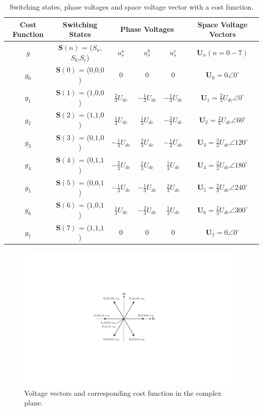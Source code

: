 \begin{table}[t]
\centering
\setlength{\tabcolsep}{5pt}
\begin{tabular}{    c|
    c|
    c|c|c|c
}
\toprule
\hline
\multicolumn{1}{c|}{Cost Function} & \multicolumn{1}{c|}{Switching States} & \multicolumn{3}{c}{Phase Voltages} & \multicolumn{1}{|c}{Space Voltage Vectors} \\
\hline
$g$ &$\mathbf{S}(n)$ = ($S_a$,$S_b$,$S_c$) & $u^a_{s}$ & $u^b_{s}$ & $u^c_{s}$ & $\mathbf{U}_n(n =0-7)$\\  
\hline
$g_0$ & $\mathbf{S}(0)$ = ($0$,$0$,$0$) & $0$ & $0$ & $0$ & $\mathbf{U}_0 =0\angle 0^\circ$ \\
$g_1$ &  $\mathbf{S}(1)$ = ($1$,$0$,$0$) & $\frac{2}{3}U_{dc}$ & $-\frac{1}{3}U_{dc}$ & $-\frac{1}{3}U_{dc}$ & $\mathbf{U}_1 =\frac{2}{3}U_{dc}\angle 0^\circ$\\
$g_2$ &  $\mathbf{S}(2)$ = ($1$,$1$,$0$) & $\frac{1}{3}U_{dc}$ & $\frac{1}{3}U_{dc}$ & $-\frac{2}{3}U_{dc}$ & $\mathbf{U}_2 =\frac{2}{3}U_{dc}\angle 60^\circ$\\
$g_3$ & $\mathbf{S}(3)$ = ($0$,$1$,$0$) & $-\frac{1}{3}U_{dc}$ & $\frac{2}{3}U_{dc}$ & $-\frac{1}{3}U_{dc}$ & $\mathbf{U}_3 =\frac{2}{3}U_{dc}\angle 120^\circ$ \\
$g_4$ & $\mathbf{S}(4)$ = ($0$,$1$,$1$) & $-\frac{2}{3}U_{dc}$ & $\frac{1}{3}U_{dc}$ & $\frac{1}{3}U_{dc}$ & $\mathbf{U}_4 =\frac{2}{3}U_{dc}\angle 180^\circ$ \\
$g_5$ & $\mathbf{S}(5)$ = ($0$,$0$,$1$) & $-\frac{1}{3}U_{dc}$ & $-\frac{1}{3}U_{dc}$ & $\frac{2}{3}U_{dc}$ & $\mathbf{U}_5 =\frac{2}{3}U_{dc}\angle 240^\circ$\\
$g_6$ &  $\mathbf{S}(6)$ = ($1$,$0$,$1$) & $\frac{1}{3}U_{dc}$ & $-\frac{2}{3}U_{dc}$ & $\frac{1}{3}U_{dc}$ & $\mathbf{U}_6 =\frac{2}{3}U_{dc}\angle 300^\circ$\\
$g_7$ &  $\mathbf{S}(7)$ = ($1$,$1$,$1$) & $0$ & $0$ & $0$ & $\mathbf{U}_7 =0\angle 0^\circ$\\
\hline
\bottomrule
\end{tabular}
\caption{Switching states, phase 
 voltages and space voltage vector with a cost function.}\label{Table:2.1}
\end{table}
\begin{figure}[t]
    \centering
    \includegraphics[scale=0.70]{chapters/Fig2.8.pdf}
    \caption{Voltage vectors and corresponding cost function in the complex plane.}
    \label{Fig:2.8}
\end{figure}

